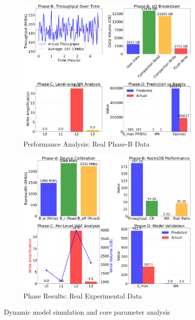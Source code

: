 \documentclass[11pt]{article}
\begin{document}
\begin{figure}[H]
\centering
\begin{subfigure}{0.48\textwidth}
\centering
\includegraphics[width=\textwidth]{experiments/2025-09-05/real_performance_analysis.png}
\caption{Performance Analysis: Real Phase-B Data}
\label{fig:model_simulation}
\end{subfigure}
\hfill
\begin{subfigure}{0.48\textwidth}
\centering
\includegraphics[width=\textwidth]{experiments/2025-09-05/real_phase_results.png}
\caption{Phase Results: Real Experimental Data}
\label{fig:core_parameters}
\end{subfigure}
\caption{Dynamic model simulation and core parameter analysis}
\end{figure}
\end{document}

